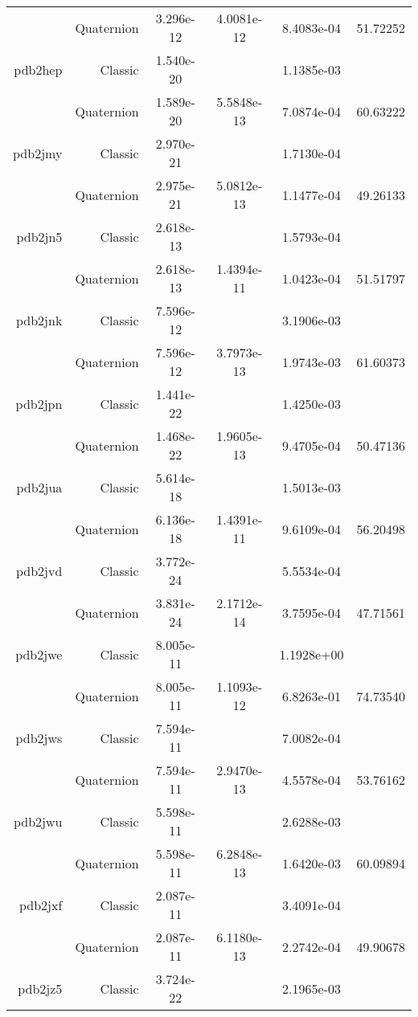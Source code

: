 \begin{xltabular}{\textwidth}{r|rS[table-format=1.3e+2]S[table-format=1.4e+2]S[table-format=1.4e+2]S[table-format=-1.5]}
& Quaternion & 3.296e-12 & 4.0081e-12 & 8.4083e-04 & 51.72252\\  \addlinespace
pdb2hep & Classic & 1.540e-20 &  & 1.1385e-03 & \\
& Quaternion & 1.589e-20 & 5.5848e-13 & 7.0874e-04 & 60.63222\\  \addlinespace
pdb2jmy & Classic & 2.970e-21 &  & 1.7130e-04 & \\
& Quaternion & 2.975e-21 & 5.0812e-13 & 1.1477e-04 & 49.26133\\  \addlinespace
pdb2jn5 & Classic & 2.618e-13 &  & 1.5793e-04 & \\
& Quaternion & 2.618e-13 & 1.4394e-11 & 1.0423e-04 & 51.51797\\  \addlinespace
pdb2jnk & Classic & 7.596e-12 &  & 3.1906e-03 & \\
& Quaternion & 7.596e-12 & 3.7973e-13 & 1.9743e-03 & 61.60373\\  \addlinespace
pdb2jpn & Classic & 1.441e-22 &  & 1.4250e-03 & \\
& Quaternion & 1.468e-22 & 1.9605e-13 & 9.4705e-04 & 50.47136\\  \addlinespace
pdb2jua & Classic & 5.614e-18 &  & 1.5013e-03 & \\
& Quaternion & 6.136e-18 & 1.4391e-11 & 9.6109e-04 & 56.20498\\  \addlinespace
pdb2jvd & Classic & 3.772e-24 &  & 5.5534e-04 & \\
& Quaternion & 3.831e-24 & 2.1712e-14 & 3.7595e-04 & 47.71561\\  \addlinespace
pdb2jwe & Classic & 8.005e-11 &  & 1.1928e+00 & \\
& Quaternion & 8.005e-11 & 1.1093e-12 & 6.8263e-01 & 74.73540\\  \addlinespace
pdb2jws & Classic & 7.594e-11 &  & 7.0082e-04 & \\
& Quaternion & 7.594e-11 & 2.9470e-13 & 4.5578e-04 & 53.76162\\  \addlinespace
pdb2jwu & Classic & 5.598e-11 &  & 2.6288e-03 & \\
& Quaternion & 5.598e-11 & 6.2848e-13 & 1.6420e-03 & 60.09894\\  \addlinespace
pdb2jxf & Classic & 2.087e-11 &  & 3.4091e-04 & \\
& Quaternion & 2.087e-11 & 6.1180e-13 & 2.2742e-04 & 49.90678\\  \addlinespace
pdb2jz5 & Classic & 3.724e-22 &  & 2.1965e-03 & \\

\end{xltabular}
